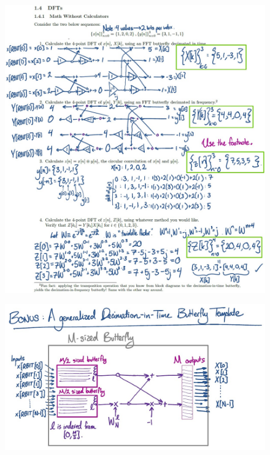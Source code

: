 \documentclass{article}
\begin{document}
\begin{figure}[h]
\begin{center}
    \includegraphics[width=0.95 \textwidth]{figures/Solutions pg 6.jpg}
    \label{fig:old_solutions_6}
\end{center}
\end{figure}

\newpage

\begin{figure}[h]
\begin{center}
    \includegraphics[width= \textwidth]{figures/Solutions pg 7.jpg}
    \label{fig:old_solutions_7}
\end{center}
\end{figure}
\end{document}
